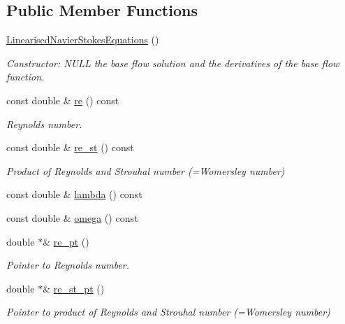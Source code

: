 \subsection*{Public Member Functions}
\begin{DoxyCompactItemize}
\item 
\hyperlink{classoomph_1_1LinearisedNavierStokesEquations_a003cf08dd97000e885e4f13b14a879b1}{Linearised\+Navier\+Stokes\+Equations} ()
\begin{DoxyCompactList}\small\item\em Constructor\+: N\+U\+LL the base flow solution and the derivatives of the base flow function. \end{DoxyCompactList}\item 
const double \& \hyperlink{classoomph_1_1LinearisedNavierStokesEquations_a310f3fe61c7b2a0c7fcdf0b1efce97bc}{re} () const
\begin{DoxyCompactList}\small\item\em Reynolds number. \end{DoxyCompactList}\item 
const double \& \hyperlink{classoomph_1_1LinearisedNavierStokesEquations_a4b56a1b8376f110d64852ab2b9c64696}{re\+\_\+st} () const
\begin{DoxyCompactList}\small\item\em Product of Reynolds and Strouhal number (=Womersley number) \end{DoxyCompactList}\item 
const double \& \hyperlink{classoomph_1_1LinearisedNavierStokesEquations_aa47a26bbbce6945f0c7112097010c9f8}{lambda} () const
\item 
const double \& \hyperlink{classoomph_1_1LinearisedNavierStokesEquations_ae00c6162cce709644cdd1c8ab9a94ed1}{omega} () const
\item 
double $\ast$\& \hyperlink{classoomph_1_1LinearisedNavierStokesEquations_aee01216b1e67c105371b812fb044e61a}{re\+\_\+pt} ()
\begin{DoxyCompactList}\small\item\em Pointer to Reynolds number. \end{DoxyCompactList}\item 
double $\ast$\& \hyperlink{classoomph_1_1LinearisedNavierStokesEquations_a8d51b589917735089a066382561456cc}{re\+\_\+st\+\_\+pt} ()
\begin{DoxyCompactList}\small\item\em Pointer to product of Reynolds and Strouhal number (=Womersley number) \end{DoxyCompactList}\item 

\end{DoxyCompactItemize}
